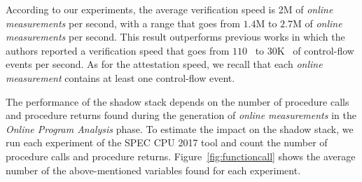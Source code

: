 According to our experiments, the average verification speed is 2M of 
\emph{online measurements} per second, with a range that goes from $1.4$M to 
$2.7$M of \emph{online measurements} per second. This result outperforms 
previous works in which the authors reported a verification speed that goes 
from $110$~\cite{Dessouky:2018:LLH:3240765.3240821} to $30$K~\cite{aberadiat} 
of control-flow events per second. As for the attestation speed, we recall that 
each \emph{online measurement} contains at least one control-flow event.

The performance of the shadow stack depends on the number of 
procedure calls and procedure returns found during the generation of 
\emph{online measurements} in the \emph{Online Program Analysis} phase. 
To estimate the impact on the shadow stack, we run each experiment of the SPEC 
CPU 2017 tool and count the number of procedure calls and procedure returns. 
Figure~\ref{fig:functioncall} shows the average number of the above-mentioned 
variables found for each experiment. 
